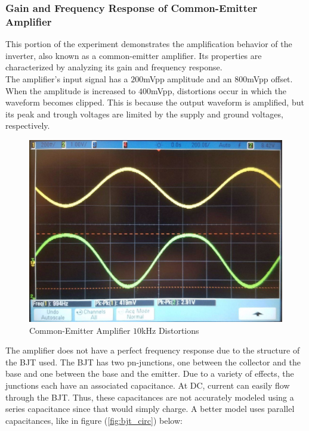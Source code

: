 \subsubsection{Gain and Frequency Response of Common-Emitter Amplifier}
This portion of the experiment demonstrates the amplification behavior of the inverter, also known as a common-emitter amplifier. Its properties are characterized by analyzing its gain and frequency response. \\
The amplifier's input signal has a $200$\si{\milli\volt}pp amplitude and an $800$\si{\milli\volt}pp offset.
When the amplitude is increased to $400$\si{\milli\volt}pp, distortions occur in which the waveform becomes clipped. This is because the output waveform is amplified, but its peak and trough voltages are limited by the supply and ground voltages, respectively.
\FloatBarrier
\begin{figure}[h!]
	\centering
	\includegraphics[scale=0.25]{../images/amplifier_10ghz_clamping.jpeg}
	\caption{Common-Emitter Amplifier $10$\si{\kilo\hertz} Distortions}
	\label{fig:clamping}
\end{figure}
\FloatBarrier
The amplifier does not have a perfect frequency response due to the structure of the BJT used. The BJT has two pn-junctions, one between the collector and the base and one between the base and the emitter. Due to a variety of effects, the junctions each have an associated capacitance. At DC, current can easily flow through the BJT. Thus, these capacitances are not accurately modeled using a series capacitance since that would simply charge. A better model uses parallel capacitances, like in figure (\ref{fig:bjt_circ}) below:

